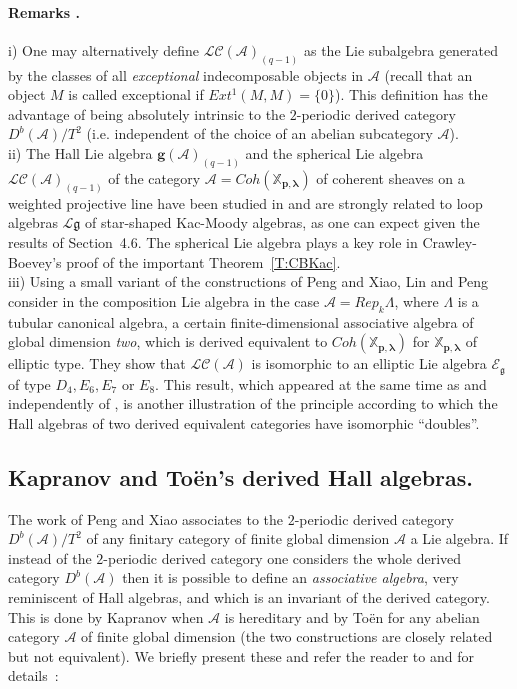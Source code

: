 \documentclass[a4paper,10pt]{amsart}
\def\A{\mathcal{A}}
\def\g{\mathfrak{g}}
\def\xpl{\mathbb{X}_{\mathbf{p},\boldsymbol{\lambda}}}
\numberwithin{equation}{section}
\begin{document}
{\paragraph{\textbf{Remarks \thetheo.}} i) One may alternatively define $\mathcal{LC}(\A)_{(q-1)}$ as the Lie subalgebra generated by the classes of all \textit{exceptional} indecomposable objects in $\A$ (recall that an object $M$ is called exceptional if $Ext^1(M,M)=\{0\}$). This definition has the advantage of being absolutely intrinsic to the $2$-periodic derived category $D^b(\A)/T^2$ (i.e. independent of the choice of an abelian subcategory $\A$).\\
ii) The Hall Lie algebra $\mathbf{g}(\A)_{(q-1)}$ and the spherical Lie algebra $\mathcal{LC}(\A)_{(q-1)}$ of the category $\A=Coh(\xpl)$ of coherent sheaves on a weighted projective line have been studied in \cite{CB2} and are strongly related to loop algebras $\mathcal{L}\g$ of star-shaped Kac-Moody algebras, as one can expect given the results of Section~4.6. The spherical Lie algebra plays a key role in Crawley-Boevey's proof of the important Theorem~\ref{T:CBKac}.\\
iii) Using a small variant of the constructions of Peng and Xiao, Lin and Peng consider in \cite{LP} the composition Lie algebra in the case $\A=Rep_k\Lambda$, where $\Lambda$ is a tubular canonical algebra, a certain finite-dimensional associative algebra of global dimension \textit{two}, which is derived equivalent to $Coh(\xpl)$ for $\xpl$ of elliptic type. They show that $\mathcal{LC}(\A)$ is isomorphic to an elliptic Lie algebra $\mathcal{E}_{\g}$ of type $D_4,E_6,E_7$ or $E_8$. This result, which appeared at the same time as and independently of \cite{SDuke}, is another illustration of the principle according to which the Hall algebras of two derived equivalent categories have isomorphic ``doubles''.

\vspace{.2in}

\subsection{Kapranov and To\"en's derived Hall algebras.}

\vspace{.2in}

The work of Peng and Xiao associates to the $2$-periodic derived category $D^b(\A)/T^2$ of any finitary category of finite global dimension $\A$ a Lie algebra. If instead of the $2$-periodic derived category one considers the whole derived category $D^b(\A)$ then it is possible to define an \textit{associative algebra}, very reminiscent of Hall algebras, and which is an invariant of the derived category. This is done by Kapranov when $\A$ is hereditary and by To\"en for any abelian category $\A$ of finite global dimension (the two constructions are closely related but not equivalent). We briefly present these and refer the reader to \cite{Kap2} and \cite{Toen} for details~:

}
\end{document}
